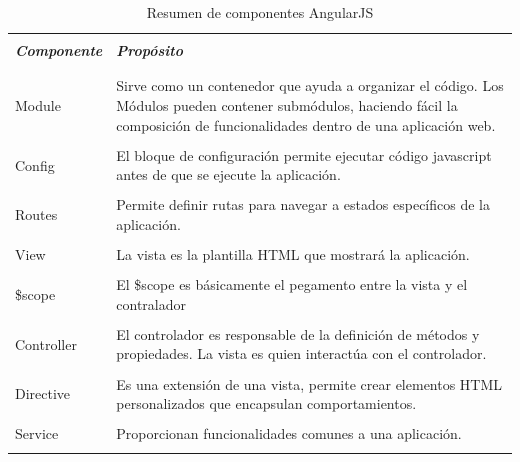 			\begin{table}[H]
				\begin{tabular}{|p{2.75cm}|p{14cm}|} \hline
					 & \\
					\textit{\bfseries Componente} & \textit{\bfseries Propósito} \\
					 & \\ \hline
					 
					 & \\
					Module & Sirve como un contenedor que ayuda a organizar el
					código. Los Módulos pueden contener submódulos, haciendo fácil la
					composición de funcionalidades dentro de una aplicación web.\\
					 & \\
					 
					Config & El bloque de configuración permite ejecutar código javascript
					antes de que se ejecute la aplicación.\\
					 & \\
					
					Routes & Permite definir rutas para navegar a estados específicos de la
					aplicación.\\
					& \\
					
					View & La vista es la plantilla HTML que mostrará la aplicación.\\
					& \\
					
					\$scope & El \$scope es básicamente el pegamento entre la vista y el
					contralador\\
					& \\
					
					Controller & El controlador es responsable de la definición de métodos y
					propiedades. La vista es quien interactúa con el controlador.\\
					& \\
					
					Directive & Es una extensión de una vista, permite crear
					elementos HTML personalizados que encapsulan comportamientos.\\
					& \\
					Service & Proporcionan funcionalidades comunes a una aplicación.\\
					& \\ \hline
				\end{tabular}
				\caption{Resumen de componentes AngularJS}
			\end{table}
			
